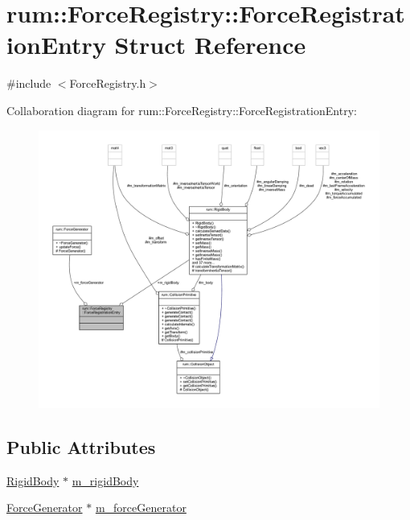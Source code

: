 \hypertarget{structrum_1_1_force_registry_1_1_force_registration_entry}{}\section{rum\+:\+:Force\+Registry\+:\+:Force\+Registration\+Entry Struct Reference}
\label{structrum_1_1_force_registry_1_1_force_registration_entry}


{\ttfamily \#include $<$Force\+Registry.\+h$>$}



Collaboration diagram for rum\+:\+:Force\+Registry\+:\+:Force\+Registration\+Entry\+:\nopagebreak
\begin{figure}[H]
\begin{center}
\leavevmode
\includegraphics[width=350pt]{structrum_1_1_force_registry_1_1_force_registration_entry__coll__graph}
\end{center}
\end{figure}
\subsection*{Public Attributes}
\begin{DoxyCompactItemize}
\item 
\mbox{\hyperlink{classrum_1_1_rigid_body}{Rigid\+Body}} $\ast$ \mbox{\hyperlink{structrum_1_1_force_registry_1_1_force_registration_entry_ab9275517ec2525b88a1798b9cfe7df24}{m\+\_\+rigid\+Body}}
\item 
\mbox{\hyperlink{classrum_1_1_force_generator}{Force\+Generator}} $\ast$ \mbox{\hyperlink{structrum_1_1_force_registry_1_1_force_registration_entry_ade24f35c350a49149da9a2a0d41af0d5}{m\+\_\+force\+Generator}}
\end{DoxyCompactItemize}


